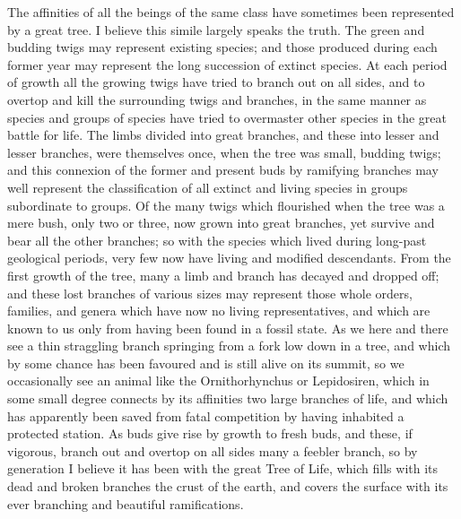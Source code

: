 \indent The affinities of all the beings of the same class have sometimes been represented by a great tree. I believe this simile largely speaks the truth. The green and budding twigs may represent existing species; and those produced during each former year may represent the long succession of extinct species. At each period of growth all the growing twigs have tried to branch out on all sides, and to overtop and kill the surrounding twigs and branches, in the same manner as species and groups of species have tried to overmaster other species in the great battle for life. The limbs divided into great branches, and these into lesser and lesser branches, were themselves once, when the tree was small, budding twigs; and this connexion of the former and present buds by ramifying branches may well represent the classification of all extinct and living species in groups subordinate to groups. Of the many twigs which flourished when the tree was a mere bush, only two or three, now grown into great branches, yet survive and bear all the other branches; so with the species which lived during long-past geological periods, very few now have living and modified descendants. From the first growth of the tree, many a limb and branch has decayed and dropped off; and these lost branches of various sizes may represent those whole orders, families, and genera which have now no living representatives, and which are known to us only from having been found in a fossil state. As we here and there see a thin straggling branch springing from a fork low down in a tree, and which by some chance has been favoured and is still alive on its summit, so we occasionally see an animal like the Ornithorhynchus or Lepidosiren, which in some small degree connects by its affinities two large branches of life, and which has apparently been saved from fatal competition by having inhabited a protected station. As buds give rise by growth to fresh buds, and these, if vigorous, branch out and overtop on all sides many a feebler branch, so by generation I believe it has been with the great Tree of Life, which fills with its dead and broken branches the crust of the earth, and covers the surface with its ever branching and beautiful ramifications.